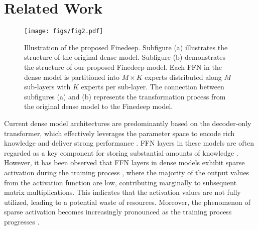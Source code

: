 \section{Related Work}
\begin{figure*}[t]
\centering
\centerline{\texttt{[image: figs/fig2.pdf]}}
\caption{Illustration of the proposed Finedeep. Subfigure (a) illustrates the structure of the original dense model. Subfigure (b) demonstrates the structure of our proposed Finedeep model. Each FFN in the dense model is partitioned into $M\times K$ experts distributed along $M$ sub-layers with $K$ experts per sub-layer. The connection between subfigures (a) and (b) represents the transformation process from the original dense model to the Finedeep model.}
\label{fig2}
\end{figure*}

Current dense model architectures are predominantly based on the decoder-only transformer, which effectively leverages the parameter space to encode rich knowledge and deliver strong performance \cite{DBLP:conf/nips/BrownMRSKDNSSAA20, DBLP:journals/corr/abs-2302-13971, touvron2023llama, dubey2024llama}. FFN layers in these models are often regarded as a key component for storing substantial amounts of knowledge \cite{geva2021transformer, dai2022knowledge}. However, it has been observed that FFN layers in dense models exhibit sparse activation during the training process \cite{zhang2022moefication}, where the majority of the output values from the activation function are low, contributing marginally to subsequent matrix multiplications. This indicates that the activation values are not fully utilized, leading to a potential waste of resources. Moreover, the phenomenon of sparse activation becomes increasingly pronounced as the training process progresses \cite{luo2024sparsing}.

